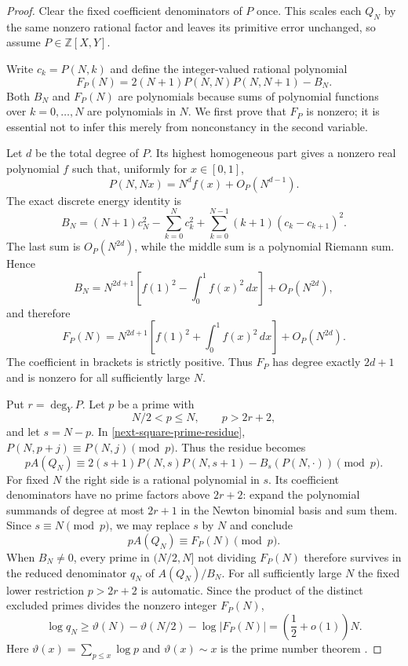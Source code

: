 \documentclass[11pt,a4paper]{article}
\theoremstyle{definition}
\theoremstyle{remark}
\begin{document}
\begin{proof}
Clear the fixed coefficient denominators of $P$ once. This scales each
$Q_N$ by the same nonzero rational factor and leaves its primitive error
unchanged, so assume $P\in\mathbb Z[X,Y]$.

Write $c_k=P(N,k)$ and define the integer-valued rational polynomial
\begin{equation}
 F_P(N)=2(N+1)P(N,N)P(N,N+1)-B_N.
 \label{next-square-F-polynomial}
\end{equation}
Both $B_N$ and $F_P(N)$ are polynomials because sums of polynomial
functions over $k=0,\ldots,N$ are polynomials in $N$. We first prove
that $F_P$ is nonzero; it is essential not to infer this merely from
nonconstancy in the second variable.

Let $d$ be the total degree of $P$. Its highest homogeneous part gives
a nonzero real polynomial $f$ such that, uniformly for $x\in[0,1]$,
\[
 P(N,Nx)=N^d f(x)+O_P(N^{d-1}).
\]
The exact discrete energy identity is
\begin{equation}
 B_N=(N+1)c_N^2-\sum_{k=0}^N c_k^2
       +\sum_{k=0}^{N-1}(k+1)(c_k-c_{k+1})^2.
 \label{next-square-energy}
\end{equation}
The last sum is $O_P(N^{2d})$, while the middle sum is a polynomial
Riemann sum. Hence
\[
 B_N=N^{2d+1}
 \left[f(1)^2-\int_0^1 f(x)^2\,dx\right]+O_P(N^{2d}),
\]
and therefore
\begin{equation}
 F_P(N)=N^{2d+1}
 \left[f(1)^2+\int_0^1 f(x)^2\,dx\right]+O_P(N^{2d}).
 \label{next-square-F-leading}
\end{equation}
The coefficient in brackets is strictly positive. Thus $F_P$ has
degree exactly $2d+1$ and is nonzero for all sufficiently large $N$.

Put $r=\deg_Y P$. Let $p$ be a prime with
\[
 N/2<p\le N,\qquad p>2r+2,
\]
and let $s=N-p$. In \eqref{next-square-prime-residue},
$P(N,p+j)\equiv P(N,j)\pmod p$. Thus the residue becomes
\[
 pA(Q_N)\equiv
 2(s+1)P(N,s)P(N,s+1)-B_s(P(N,\cdot))\pmod p.
\]
For fixed $N$ the right side is a rational polynomial in $s$. Its
coefficient denominators have no prime factors above $2r+2$:
expand the polynomial summands of degree at most $2r+1$ in the Newton
binomial basis and sum them. Since $s\equiv N\pmod p$, we may replace
$s$ by $N$ and conclude
\begin{equation}
 pA(Q_N)\equiv F_P(N)\pmod p.
 \label{next-square-poly-prime}
\end{equation}
When $B_N\ne0$, every prime in $(N/2,N]$ not dividing $F_P(N)$ therefore
survives in the reduced denominator $q_N$ of $A(Q_N)/B_N$.
For all sufficiently large $N$ the fixed lower restriction $p>2r+2$
is automatic. Since the product of the distinct excluded primes divides
the nonzero integer $F_P(N)$,
\[
 \log q_N\ge
 \vartheta(N)-\vartheta(N/2)-\log|F_P(N)|
 =\left(\frac12+o(1)\right)N.
\]
Here $\vartheta(x)=\sum_{p\le x}\log p$ and
$\vartheta(x)\sim x$ is the prime number theorem
\cite{dlmf-primes}.


\end{proof}
\end{document}
